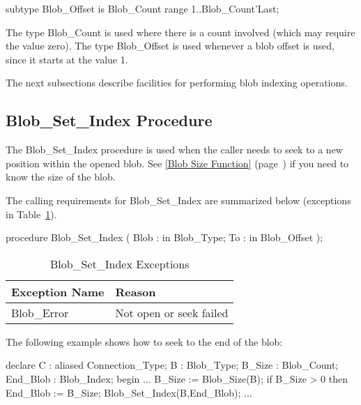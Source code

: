 \documentclass[english,letterpaper]{book}
\newcommand\Ref[1]{\textsection\ref{#1} (page~\pageref{#1})}
\begin{document}
\begin{Code}

   subtype Blob_Offset is 
      Blob_Count range 1..Blob_Count'Last;

\end{Code}

The type Blob\_Count is used where there is a count involved
(which may require the value zero). The type Blob\_Offset is
used whenever a blob offset is used, since it starts at the value
1.

The next subsections describe facilities for performing blob indexing
operations.


\subsection{Blob\_Set\_Index Procedure}

The Blob\_Set\_Index procedure is used when the caller needs to seek
to a new position within the opened blob. See \Ref{Blob Size Function}
if you need to know the size of the blob.

The calling requirements for Blob\_Set\_Index are summarized below
(exceptions in Table~\ref{t:blbsxx}).

\begin{Code}
procedure Blob_Set_Index (
   Blob : in Blob_Type;
   To :   in Blob_Offset
);
\end{Code}

\begin{table}
   \begin{center}
      \begin{tabular}{ll}
         Exception Name    &  Reason\\
         \hline 
         Blob\_Error       &  Not open or seek failed\\
      \end{tabular}
   \end{center}
   \caption{Blob\_Set\_Index Exceptions}\label{t:blbsxx}
\end{table}

The following example shows how to seek to the end of the blob:

\begin{Example}
declare
   C :        aliased Connection_Type;
   B :        Blob_Type;
   B_Size :   Blob_Count;
   End_Blob : Blob_Index;
begin
   ...
   B_Size := Blob_Size(B);
   if B_Size > 0 then
      End_Blob := B_Size;
      Blob_Set_Index(B,End_Blob);
   ...
\end{Example}
\end{document}
